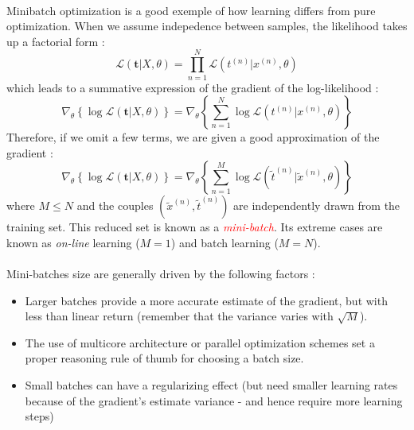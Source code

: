 \documentclass[a4paper]{article}
\newcommand\targets{\boldsymbol{t}}
\begin{document}
{{			\paragraph{} Minibatch optimization is a good exemple of how learning differs from pure optimization. When we assume indepedence between samples, the likelihood takes up a factorial form : 
			\begin{equation}
				\mathcal{L}\left(\targets\vert X,\theta\right) = \prod_{n=1}^N \mathcal{L}(t^{(n)}\vert x^{(n)},\theta)
			\end{equation}
			which leads to a summative expression of the gradient of the log-likelihood : 
			\begin{equation}
				\nabla_\theta\left\{ \log{\mathcal{L}\left(\targets\vert X,\theta\right)}\right\} = \nabla_\theta \left\{ \sum_{n=1}^N \log{\mathcal{L}\left(t^{(n)}\vert x^{(n)},\theta\right)}\right\}
			\end{equation}
			Therefore, if we omit a few terms, we are given a good approximation of the gradient : 
			\begin{equation}
				\nabla_\theta\left\{ \log{\mathcal{L}\left(\targets\vert X,\theta\right)}\right\} = \nabla_\theta \left\{ \sum_{n=1}^M \log{\mathcal{L}\left(\tilde{t}^{(n)}\vert \tilde{x}^{(n)},\theta\right)}\right\}
			\end{equation}
			where $M\leq N$ and the couples $\left(\tilde{x}^{(n)},\tilde{t}^{(n)}\right)$ are independently drawn from the training set. This reduced set is known as a \emph{\textcolor{red}{mini-batch}}. Its extreme cases are known as \emph{on-line} learning ($M=1$) and batch learning ($M=N$). 
			
			\paragraph{} Mini-batches size are generally driven by the following factors : 
			\begin{itemize}
				\item Larger batches provide a more accurate estimate of the gradient, but with less than linear return (remember that the variance varies with $\sqrt{M}$). 
				\item The use of multicore architecture or parallel optimization schemes set a proper reasoning rule of thumb for choosing a batch size. 
				\item Small batches can have a regularizing effect (but need smaller learning rates because of the gradient's estimate variance - and hence require more learning steps)
			\end{itemize}
			
}}
\end{document}
